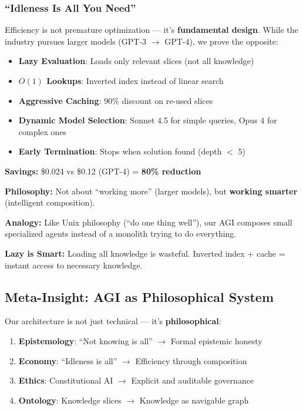 \documentclass[11pt]{article}
\begin{document}
\subsubsection{``Idleness Is All You Need''}

Efficiency is not premature optimization --- it's \textbf{fundamental design}. While the industry pursues larger models (GPT-3 $\rightarrow$ GPT-4), we prove the opposite:

\begin{itemize}
    \item \textbf{Lazy Evaluation}: Loads only relevant slices (not all knowledge)
    \item \textbf{$O(1)$ Lookups}: Inverted index instead of linear search
    \item \textbf{Aggressive Caching}: 90\% discount on re-used slices
    \item \textbf{Dynamic Model Selection}: Sonnet 4.5 for simple queries, Opus 4 for complex ones
    \item \textbf{Early Termination}: Stops when solution found (depth $<$ 5)
\end{itemize}

\textbf{Savings:} \$0.024 vs \$0.12 (GPT-4) = \textbf{80\% reduction}

\textbf{Philosophy:} Not about ``working more'' (larger models), but \textbf{working smarter} (intelligent composition).

\textbf{Analogy:} Like Unix philosophy (``do one thing well''), our AGI composes small specialized agents instead of a monolith trying to do everything.

\textbf{Lazy is Smart:} Loading all knowledge is wasteful. Inverted index + cache = instant access to necessary knowledge.

\subsection{Meta-Insight: AGI as Philosophical System}

Our architecture is not just technical --- it's \textbf{philosophical}:

\begin{enumerate}
    \item \textbf{Epistemology}: ``Not knowing is all'' $\rightarrow$ Formal epistemic honesty
    \item \textbf{Economy}: ``Idleness is all'' $\rightarrow$ Efficiency through composition
    \item \textbf{Ethics}: Constitutional AI $\rightarrow$ Explicit and auditable governance
    \item \textbf{Ontology}: Knowledge slices $\rightarrow$ Knowledge as navigable graph
\end{enumerate}
\end{document}
